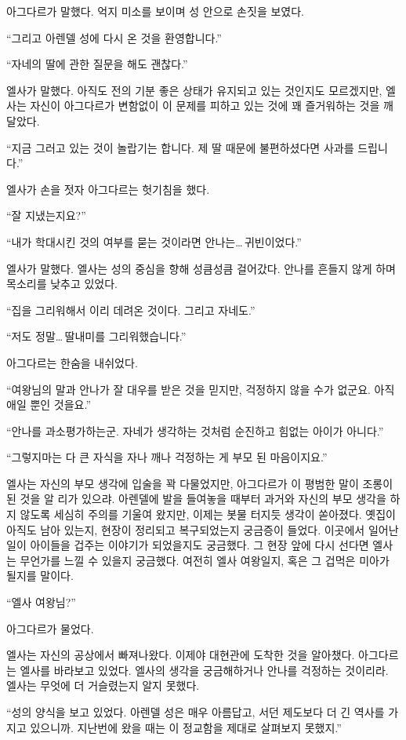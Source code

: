 아그다르가 말했다. 억지 미소를 보이며 성 안으로 손짓을 보였다.

``그리고 아렌델 성에 다시 온 것을 환영합니다.''

``자네의 딸에 관한 질문을 해도 괜찮다.''

엘사가 말했다. 아직도 전의 기분 좋은 상태가 유지되고 있는 것인지도 모르겠지만, 엘사는 자신이 아그다르가 변함없이 이 문제를 피하고 있는 것에 꽤 즐거워하는 것을 깨달았다.

`` 지금 그러고 있는 것이 놀랍기는 합니다. 제 딸 때문에 불편하셨다면 사과를 드립니다.''

엘사가 손을 젓자 아그다르는 헛기침을 했다.

``잘 지냈는지요?''

``내가 학대시킨 것의 여부를 묻는 것이라면 안나는\ldots\,귀빈이었다.''

엘사가 말했다. 엘사는 성의 중심을 향해 성큼성큼 걸어갔다. 안나를 흔들지 않게 하며 목소리를 낮추고 있었다.

``집을 그리워해서 이리 데려온 것이다. 그리고 자네도.''

``저도 정말\ldots\,딸내미를 그리워했습니다.''

아그다르는 한숨을 내쉬었다.

``여왕님의 말과 안나가 잘 대우를 받은 것을 믿지만, 걱정하지 않을 수가 없군요. 아직 애일 뿐인 것을요.''

``안나를 과소평가하는군. 자네가 생각하는 것처럼 순진하고 힘없는 아이가 아니다.''

``그렇지마는 다 큰 자식을 자나 깨나 걱정하는 게 부모 된 마음이지요.''

엘사는 자신의 부모 생각에 입술을 꽉 다물었지만, 아그다르가 이 평범한 말이 조롱이 된 것을 알 리가 있으랴. 아렌델에 발을 들여놓을 때부터 과거와 자신의 부모 생각을 하지 않도록 세심히 주의를 기울여 왔지만, 이제는 봇물 터지듯 생각이 쏟아졌다. 옛집이 아직도 남아 있는지, 현장이 정리되고 복구되었는지 궁금증이 들었다. 이곳에서 일어난 일이 아이들을 겁주는 이야기가 되었을지도 궁금했다. 그 현장 앞에 다시 선다면 엘사는 무언가를 느낄 수 있을지 궁금했다. 여전히 엘사 여왕일지, 혹은 그 겁먹은 미아가 될지를 말이다.

``엘사 여왕님?''

아그다르가 물었다.

엘사는 자신의 공상에서 빠져나왔다. 이제야 대현관에 도착한 것을 알아챘다. 아그다르는 엘사를 바라보고 있었다. 엘사의 생각을 궁금해하거나 안나를 걱정하는 것이리라. 엘사는 무엇에 더 거슬렸는지 알지 못했다.

``성의 양식을 보고 있었다. 아렌델 성은 매우 아름답고, 서던 제도보다 더 긴 역사를 가지고 있으니까. 지난번에 왔을 때는 이 정교함을 제대로 살펴보지 못했지.''

